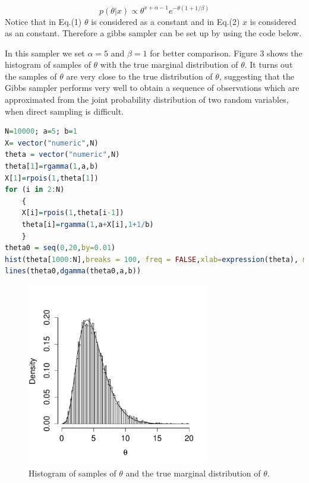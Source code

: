 \documentclass[10pt, letterpaper]{proc}
\begin{document}
\begin{equation}
p(\theta|x) \propto \theta^{x+\alpha-1}e^{-\theta(1+1/\beta)} 
\end{equation}
Notice that in Eq.(1) $\theta$ is considered as a constant and in Eq.(2) $x$ is considered as an constant. Therefore a gibbs sampler can be set up by using the code below. 

In this sampler we set $\alpha = 5$ and $\beta = 1$ for better comparison. Figure 3 shows the histogram of samples of $\theta$ with the true marginal distribution of $\theta$. It turns out the samples of $\theta$ are very close to the true distribution of $\theta$, suggesting that the Gibbs sampler performs very well to obtain a sequence of observations which are approximated from the joint probability distribution of two random variables, when direct sampling is difficult.
\begin{lstlisting}[language=R, breaklines=T, basicstyle=\footnotesize\ttfamily]
N=10000; a=5; b=1
X= vector("numeric",N)  
theta = vector("numeric",N)
theta[1]=rgamma(1,a,b)  
X[1]=rpois(1,theta[1])
for (i in 2:N)
	{
	X[i]=rpois(1,theta[i-1])
	theta[i]=rgamma(1,a+X[i],1+1/b)
	}
theta0 = seq(0,20,by=0.01)
hist(theta[1000:N],breaks = 100, freq = FALSE,xlab=expression(theta), main = "")
lines(theta0,dgamma(theta0,a,b))
\end{lstlisting}

\begin{figure}
	\centering \includegraphics[width = 8cm]{q2}
	\caption{Histogram of samples of $\theta$ and the true marginal distribution of $\theta$.}
\end{figure}
\end{document}
